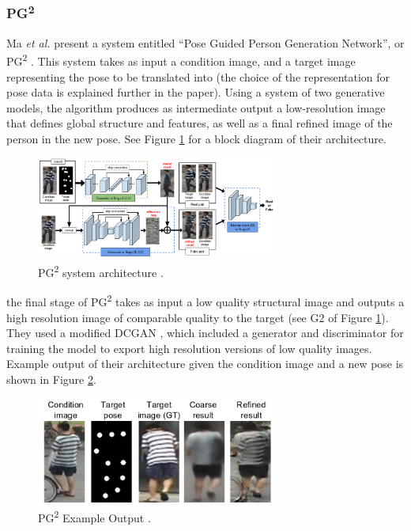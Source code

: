 \documentclass[letterpaper]{article} %
\begin{document}
\subsubsection{PG\textsuperscript{2}}
\label{subsubsec:pg2}
Ma \textit{et al.} 
present a system entitled
``Pose Guided Person Generation Network'', or PG\textsuperscript{2}
\cite{pose_guided_image_generation}.
This system takes as input a condition image, and a target image representing the pose
to be translated into (the choice of the representation for pose data is explained further in the
paper). Using a system of two generative models,
the algorithm produces as intermediate output a low-resolution
image that defines global structure and features, as well as a final refined
image of the person in the new pose. See Figure \ref{fig:pose_guided} for
a block diagram of their architecture.

\begin{figure}[htbp]
\centerline{\includegraphics[width=8cm]{pose_guided.png}}
\caption{PG\textsuperscript{2} system architecture \cite{pose_guided_image_generation}.}
\label{fig:pose_guided}
\end{figure}

the final stage of PG\textsuperscript{2} \cite{pose_guided_image_generation}
takes as input a low quality structural image and
outputs a high resolution image of comparable quality to the target
(see G2 of Figure \ref{fig:pose_guided}).
They used a modified DCGAN \cite{unsupervised_learning}, which included
a generator and discriminator for training the model to export
high resolution versions of low quality images.
Example output of their architecture given the condition image and a new pose
is shown in Figure \ref{fig:pg2_results}.

\begin{figure}[htbp]
\centerline{\includegraphics[width=8cm]{pg2_results.png}}
\caption{PG\textsuperscript{2} Example Output \cite{pose_guided_image_generation}.}
\label{fig:pg2_results}
\end{figure}
\end{document}
